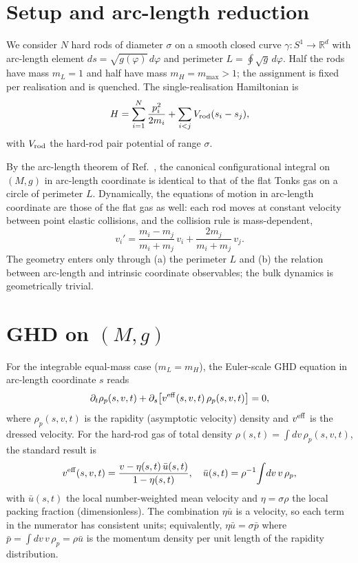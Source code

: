 \documentclass[aps,pre,twocolumn,superscriptaddress,longbibliography,floatfix]{revtex4-2}
\begin{document}
\section{Setup and arc-length reduction}\label{sec:setup}

We consider $N$ hard rods of diameter $\sigma$ on a smooth
closed curve $\gamma:S^1\to\mathbb{R}^d$ with arc-length element
$ds=\sqrt{g(\varphi)}\,d\varphi$ and perimeter
$L=\oint\sqrt{g}\,d\varphi$. Half the rods have mass $m_L=1$ and
half have mass $m_H = m_{\max}>1$; the assignment is fixed per
realisation and is quenched. The single-realisation Hamiltonian
is
\begin{equation}
H = \sum_{i=1}^N \frac{p_i^2}{2 m_i}
  + \sum_{i<j} V_{\rm rod}(s_i-s_j),
\label{eq:H}
\end{equation}
with $V_{\rm rod}$ the hard-rod pair potential of range $\sigma$.

By the arc-length theorem of Ref.~\cite{PaperI}, the canonical
configurational integral on $(M,g)$ in arc-length coordinate is
identical to that of the flat Tonks gas on a circle of
perimeter $L$. Dynamically, the equations of motion in
arc-length coordinate are those of the flat gas as well: each
rod moves at constant velocity between point elastic collisions,
and the collision rule is mass-dependent,
\begin{equation}
v_i' = \frac{m_i - m_j}{m_i + m_j}\,v_i
     + \frac{2 m_j}{m_i + m_j}\,v_j.
\label{eq:elcoll}
\end{equation}
The geometry enters only through (a) the perimeter $L$ and
(b) the relation between arc-length and intrinsic coordinate
observables; the bulk dynamics is geometrically trivial.

\section{GHD on $(M,g)$}\label{sec:ghdmg}

For the integrable equal-mass case ($m_L=m_H$), the Euler-scale
GHD equation in arc-length coordinate $s$ reads
\begin{equation}
\partial_t \rho_p(s,v,t)
+ \partial_s\!\left[v^{\rm eff}(s,v,t)\,\rho_p(s,v,t)\right] = 0,
\label{eq:ghd}
\end{equation}
where $\rho_p(s,v,t)$ is the rapidity (asymptotic velocity)
density and $v^{\rm eff}$ is the dressed velocity. For the
hard-rod gas of total density $\rho(s,t)=\int dv\,\rho_p(s,v,t)$,
the standard result is \cite{DoyonSpohn2017,BDS1983}
\begin{equation}
v^{\rm eff}(s,v,t) = \frac{v - \eta(s,t)\,\bar u(s,t)}{1 - \eta(s,t)},
\quad
\bar u(s,t) = \rho^{-1}\!\int\!dv\,v\,\rho_p,
\label{eq:veff}
\end{equation}
with $\bar u(s,t)$ the local number-weighted mean velocity and
$\eta = \sigma\rho$ the local packing fraction (dimensionless).
The combination $\eta\bar u$ is a velocity, so each term in the
numerator has consistent units;
equivalently, $\eta\bar u = \sigma\bar p$ where
$\bar p = \int\!dv\,v\,\rho_p = \rho\bar u$ is the momentum density
per unit length of the rapidity distribution.
\end{document}
